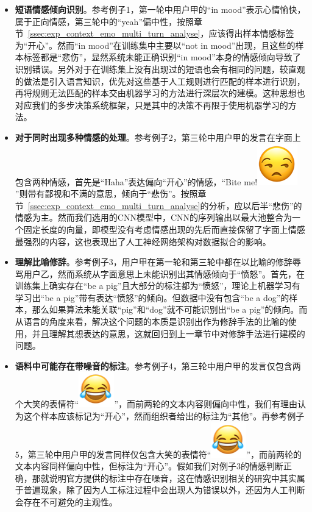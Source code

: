 \begin{itemize}

\item {\bf 短语情感倾向识别}。参考例子1，第一轮中用户甲的“in mood”表示心情愉快，属于正向情感，第三轮中的“yeah”偏中性，按照章节~\ref{ssec:exp_context_emo_multi_turn_analyse}，应该得出样本情感标签为“开心”。然而“in mood”在训练集中主要以“not in mood”出现，且这些的样本标签都是“悲伤”，显然系统未能正确识别“in mood”本身的情感倾向导致了识别错误。另外对于在训练集上没有出现过的短语也会有相同的问题，较直观的做法是引入语言知识，优先对这些基于人工规则进行匹配的样本进行识别，再将规则无法匹配的样本交由机器学习的方法进行深层次的建模。这种思想也对应我们的多步决策系统框架，只是其中的决策不再限于使用机器学习的方法。

\item {\bf 对于同时出现多种情感的处理}。参考例子2，第三轮中用户甲的发言在字面上包含两种情感，首先是“Haha”表达偏向“开心”的情感，“Bite me!\includegraphics[height=1.5\fontcharht\font`\B]{img/emoji/speechless.png}”则带有鄙视和不满的意思，倾向于“悲伤”。按照章节~\ref{ssec:exp_context_emo_multi_turn_analyse}的分析，应以后半“悲伤”的情感为主。然而我们选用的CNN模型中，CNN的序列输出以最大池整合为一个固定长度的向量，即模型没有考虑情感出现的先后而直接保留了字面上情感最强烈的内容，这也表现出了人工神经网络架构对数据拟合的影响。

\item {\bf 理解比喻修辞}。参考例子3，用户甲在第一轮和第三轮中都在以比喻的修辞辱骂用户乙，然而系统从字面意思上未能识别出其情感倾向于“愤怒”。首先，在训练集上确实存在“be a pig”且大部分的标注都为“愤怒”，理论上机器学习有学习出“be a pig”带有表达“愤怒”的倾向。但数据中没有包含“be a dog”的样本，那么如果算法未能关联“pig”和“dog”就不可能识别出“be a pig”的倾向。而从语言的角度来看，解决这个问题的本质是识别出作为修辞手法的比喻的使用，并且理解其想表达的意思，这就回归到上一章节中对修辞手法进行建模的问题。

\item {\bf 语料中可能存在带噪音的标注}。参考例子4，第三轮中用户甲的发言仅包含两个大笑的表情符“\includegraphics[height=1.5\fontcharht\font`\B]{img/emoji/lol.png}”，而前两轮的文本内容则偏向中性，我们有理由认为这个样本应该标记为“开心”，然而组织者给出的标注为“其他”。再参考例子5，第三轮中用户甲的发言同样仅包含大笑的表情符“\includegraphics[height=1.5\fontcharht\font`\B]{img/emoji/lol.png}”，而前两轮的文本内容同样偏向中性，但标注为“开心”。假如我们对例子3的情感判断正确，那就说明官方提供的标注中存在噪音，这在情感识别相关的研究中其实属于普遍现象，除了因为人工标注过程中会出现人为错误以外，还因为人工判断会存在不可避免的主观性。


\end{itemize}
